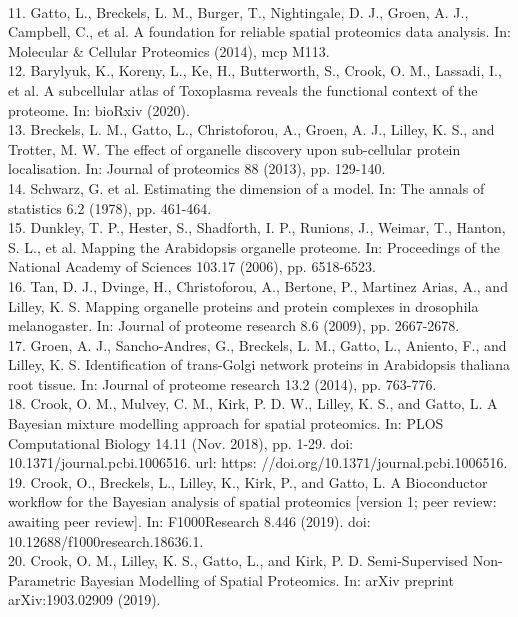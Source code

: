 \documentclass[12pt,english]{article}
\begin{document}
\\
11. Gatto, L., Breckels, L. M., Burger, T., Nightingale, D. J., Groen, A. J., Campbell,
C., et al. A foundation for reliable spatial proteomics data analysis. In: Molecular \&
Cellular Proteomics (2014), mcp M113.
\\
12. Barylyuk, K., Koreny, L., Ke, H., Butterworth, S., Crook, O. M., Lassadi, I., et al.
A subcellular atlas of Toxoplasma reveals the functional context of the proteome. In:
bioRxiv (2020).
\\
13. Breckels, L. M., Gatto, L., Christoforou, A., Groen, A. J., Lilley, K. S., and Trotter,
M. W. The effect of organelle discovery upon sub-cellular protein localisation. In:
Journal of proteomics 88 (2013), pp. 129-140.
\\
14. Schwarz, G. et al. Estimating the dimension of a model. In: The annals of statistics
6.2 (1978), pp. 461-464.
\\
15. Dunkley, T. P., Hester, S., Shadforth, I. P., Runions, J., Weimar, T., Hanton, S. L.,
et al. Mapping the Arabidopsis organelle proteome. In: Proceedings of the National
Academy of Sciences 103.17 (2006), pp. 6518-6523.
\\
16. Tan, D. J., Dvinge, H., Christoforou, A., Bertone, P., Martinez Arias, A., and Lilley,
K. S. Mapping organelle proteins and protein complexes in drosophila melanogaster.
In: Journal of proteome research 8.6 (2009), pp. 2667-2678.
\\
17. Groen, A. J., Sancho-Andres, G., Breckels, L. M., Gatto, L., Aniento, F., and Lilley,
K. S. Identification of trans-Golgi network proteins in Arabidopsis thaliana root
tissue. In: Journal of proteome research 13.2 (2014), pp. 763-776.
\\
18. Crook, O. M., Mulvey, C. M., Kirk, P. D. W., Lilley, K. S., and Gatto, L. A Bayesian
mixture modelling approach for spatial proteomics. In: PLOS Computational Biology
14.11 (Nov. 2018), pp. 1-29. doi: 10.1371/journal.pcbi.1006516. url: https:
//doi.org/10.1371/journal.pcbi.1006516.
\\
19. Crook, O., Breckels, L., Lilley, K., Kirk, P., and Gatto, L. A Bioconductor workflow
for the Bayesian analysis of spatial proteomics [version 1; peer review: awaiting peer
review]. In: F1000Research 8.446 (2019). doi: 10.12688/f1000research.18636.1.
\\
20. Crook, O. M., Lilley, K. S., Gatto, L., and Kirk, P. D. Semi-Supervised Non-Parametric
Bayesian Modelling of Spatial Proteomics. In: arXiv preprint arXiv:1903.02909 (2019).
\\
\end{document}
